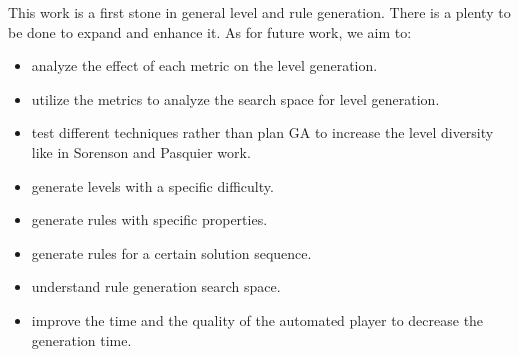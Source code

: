This work is a first stone in general level and rule generation. There is a plenty to be done to expand and enhance it. As for future work, we aim to:
\begin{itemize} \itemsep0pt \parskip0pt 
	\item analyze the effect of each metric on the level generation.
	\item utilize the metrics to analyze the search space for level generation.
	\item test different techniques rather than plan GA to increase the level diversity like in Sorenson and Pasquier work\cite{genericLevelFramework}.
	\item generate levels with a specific difficulty.
	\item generate rules with specific properties.
	\item generate rules for a certain solution sequence.
	\item understand rule generation search space.
	\item improve the time and the quality of the automated player to decrease the generation time.
\end{itemize}